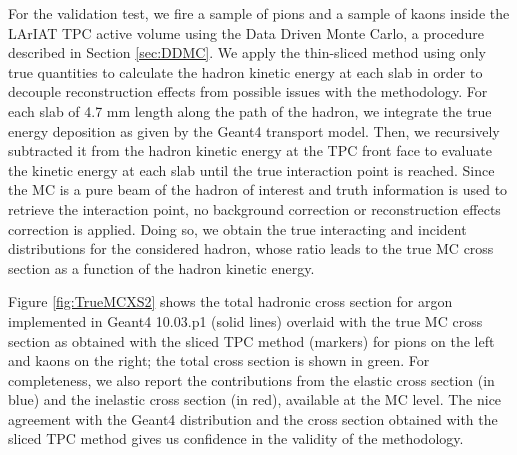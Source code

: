 For the validation test, we fire a sample of pions and a sample of kaons inside the LArIAT TPC active volume using the Data Driven Monte Carlo, a procedure described in Section \ref{sec:DDMC}. We apply the thin-sliced method using only true quantities to calculate the hadron kinetic energy at each slab in order to decouple reconstruction effects from possible issues with the methodology.  For each slab of 4.7 mm length along the path of the hadron, we integrate the true energy deposition as given by the Geant4 transport model. Then, we recursively subtracted it from the hadron kinetic energy at the TPC front face to evaluate the kinetic energy at each slab until the true interaction point is reached. Since the MC is a pure beam of the hadron of interest and truth information is used to retrieve the interaction point, no background correction or reconstruction effects correction is applied. Doing so, we obtain the true interacting and incident distributions for the considered hadron, whose ratio leads to  the true MC cross section as a function of the hadron kinetic energy. 

Figure \ref{fig:TrueMCXS2} shows the total hadronic cross section for argon implemented in Geant4 10.03.p1 (solid lines) overlaid with the true MC cross section as obtained with the sliced TPC method (markers) for pions on the left and kaons on the right; the total cross section is shown in green. For completeness, we also report the contributions from  the elastic cross section (in blue) and the inelastic cross section (in red), available at the MC level.  The nice agreement with the Geant4 distribution and the cross section  obtained with the sliced TPC method gives us confidence in the  validity of the methodology. 
        
